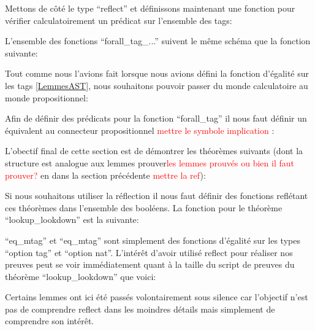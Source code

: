 \documentclass {article}
\newcommand{\codefrom}[3]
           {}
\theoremstyle{definition}
\theoremstyle{remark}
\newcommand{\todo}[1]{\textcolor{red}{#1}}
\begin{document}
\codefrom{rapport}{definitions}{reflect_iff}


Mettons de côté le type ``reflect'' et définissons maintenant une fonction
pour vérifier calculatoirement un prédicat sur l'ensemble des tags:

\codefrom{src}{association_list}{forall_tag}

L'ensemble des fonctions ``forall\_tag\_...'' suivent le même schéma que la fonction suivante:

\codefrom{src}{association_list}{forall_tag_uno}

Tout comme nous l'avions fait lorsque nous avions défini la fonction d'égalité sur les tags \ref{LemmesAST},
nous souhaitons pouvoir passer du monde calculatoire au monde propositionnel:

\codefrom{src}{association_list}{helpBefore1}
\codefrom{src}{association_list}{helpBefore2}

Afin de définir des prédicats pour la fonction ``forall\_tag'' il nous faut définir un
équivalent au connecteur propositionnel \todo{mettre le symbole implication} :

\codefrom{src}{association_list}{imply}

L'obectif final de cette section est de démontrer les théorèmes suivants (dont la structure est analogue aux lemmes prouver\todo{les lemmes prouvés ou bien il faut prouver?}
en dans la section précédente \todo{mettre la ref}):

\codefrom{src}{association_list}{lookup_lookdown}
\codefrom{src}{association_list}{lookdown_lookup}


Si nous souhaitons utiliser la réflection il nous faut définir des fonctions reflétant
ces théorèmes dans l'ensemble des booléens. La fonction pour le théorème ``lookup\_lookdown''
est la suivante:

\codefrom{src}{association_list}{lookup_encdec}
``eq\_mtag'' et ``eq\_mtag'' sont simplement des fonctions d'égalité sur les types ``option tag'' et ``option nat''.
L'intérêt d'avoir utilisé reflect pour réaliser nos preuves peut se voir immédiatement quant à la taille
du script de preuves du théorème ``lookup\_lookdown'' que voici:

\codefrom{src}{association_list}{lookup_lookdown}

\codefrom{src}{association_list}{lookup_lookdown_script}

Certains lemmes ont ici été passés volontairement sous silence car l'objectif n'est pas
de comprendre reflect dans les moindres détails mais simplement de comprendre son intérêt.
\end{document}
